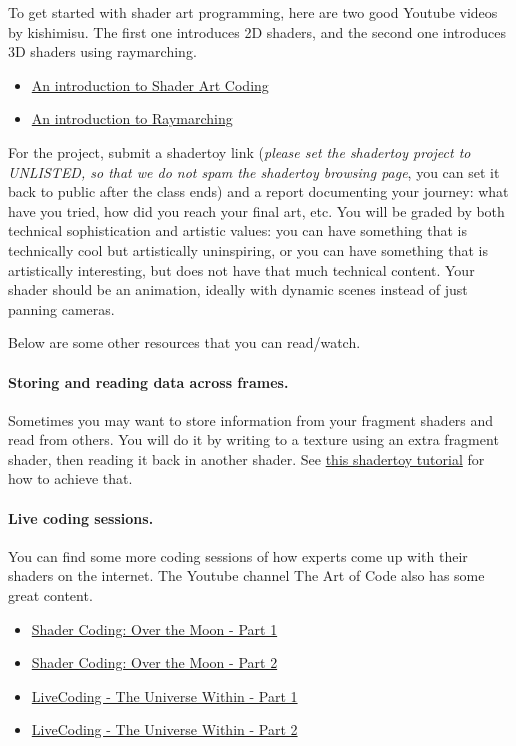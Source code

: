 To get started with shader art programming, here are two good Youtube videos by kishimisu. The first one introduces 2D shaders, and the second one introduces 3D shaders using raymarching.
\begin{itemize}
	\item \href{https://www.youtube.com/watch?v=f4s1h2YETNY}{An introduction to Shader Art Coding}
	\item \href{https://www.youtube.com/watch?v=khblXafu7iA}{An introduction to Raymarching}
\end{itemize}

For the project, submit a shadertoy link (\emph{please set the shadertoy project to UNLISTED, so that we do not spam the shadertoy browsing page}, you can set it back to public after the class ends) and a report documenting your journey: what have you tried, how did you reach your final art, etc. You will be graded by both technical sophistication and artistic values: you can have something that is technically cool but artistically uninspiring, or you can have something that is artistically interesting, but does not have that much technical content.
Your shader should be an animation, ideally with dynamic scenes instead of just panning cameras.

Below are some other resources that you can read/watch.

\paragraph{Storing and reading data across frames.} Sometimes you may want to store information from your fragment shaders and read from others. You will do it by writing to a texture using an extra fragment shader, then reading it back in another shader. See \href{https://www.shadertoy.com/view/tdGBDG}{this shadertoy tutorial} for how to achieve that.

\paragraph{Live coding sessions.} You can find some more coding sessions of how experts come up with their shaders on the internet. The Youtube channel The Art of Code also has some great content.
\begin{itemize}
	\item \href{https://www.youtube.com/watch?v=LLZPnh_LK8c}{Shader Coding: Over the Moon - Part 1}
	\item \href{https://www.youtube.com/watch?v=XaiYKkxvrFM}{Shader Coding: Over the Moon - Part 2}
	\item \href{https://www.youtube.com/watch?v=3CycKKJiwis}{LiveCoding - The Universe Within - Part 1}
	\item \href{https://www.youtube.com/watch?v=KGJUl8Teipk}{LiveCoding - The Universe Within - Part 2}
\end{itemize}

